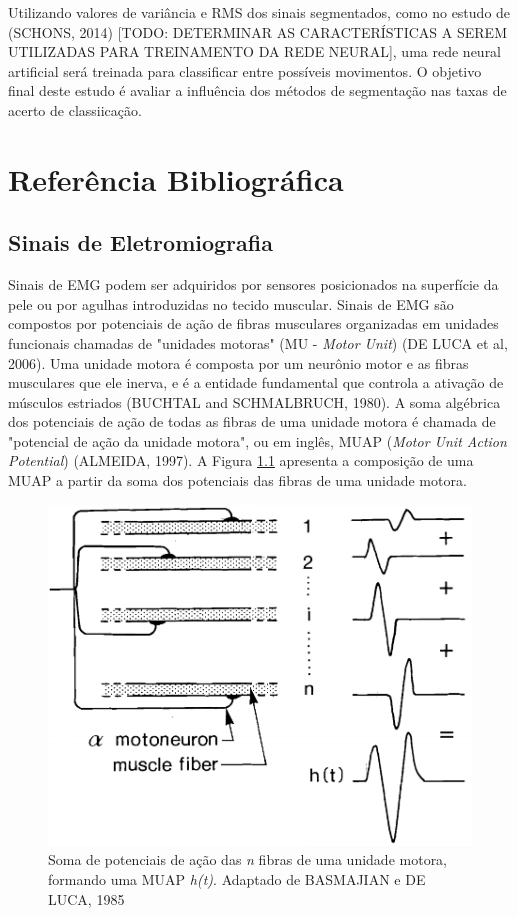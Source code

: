 \documentclass[
	12pt,				%
	openright,			%
	oneside,
	a4paper,			%
	english,			%
	francais,			%
	spanish,			%
	brazil				%
	]{abntex2}
\begin{document}
	Utilizando valores de variância e RMS dos sinais segmentados, como no estudo de (SCHONS, 2014) [TODO: DETERMINAR AS CARACTERÍSTICAS A SEREM UTILIZADAS PARA TREINAMENTO DA REDE NEURAL], uma rede neural artificial será treinada para classificar entre possíveis movimentos. O objetivo final deste estudo é avaliar a influência dos métodos de segmentação nas taxas de acerto de classiicação.
	
\chapter{Referência Bibliográfica}

\section{Sinais de Eletromiografia}

	Sinais de EMG podem ser adquiridos por sensores posicionados na superfície da pele ou por agulhas introduzidas no tecido muscular. Sinais de EMG são compostos por potenciais de ação de fibras musculares organizadas em unidades funcionais chamadas de "unidades motoras" (MU - \emph{Motor Unit}) (DE LUCA et al, 2006). Uma unidade motora é composta por um neurônio motor e as fibras musculares que ele inerva, e é a entidade fundamental que controla a ativação de músculos estriados (BUCHTAL and SCHMALBRUCH, 1980). A soma algébrica dos potenciais de ação de todas as fibras de uma unidade motora é chamada de "potencial de ação da unidade motora", ou em inglês, MUAP (\emph{Motor Unit Action Potential}) (ALMEIDA, 1997). A Figura \ref{fig:MUAP_comp} apresenta a composição de uma MUAP a partir da soma dos potenciais das fibras de uma unidade motora.

\begin{figure}
\centering
\includegraphics[width=0.6\linewidth]{../img/MUAP_oneMU.png}
\caption{Soma de potenciais de ação das \emph{n} fibras de uma unidade motora, formando uma MUAP \emph{h(t)}. Adaptado de BASMAJIAN e DE LUCA, 1985}
\label{fig:MUAP_comp}
\end{figure}
	
\end{document}
